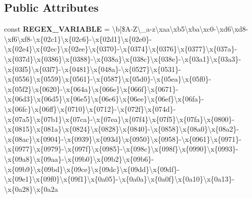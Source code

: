 \subsection*{Public Attributes}
\begin{DoxyCompactItemize}
\item 
const {\bfseries R\+E\+G\+E\+X\+\_\+\+V\+A\+R\+I\+A\+B\+LE} = \textquotesingle{}\textbackslash{}b\mbox{[}\$A-\/Z\textbackslash{}\+\_\+a-\/z\textbackslash{}xaa\textbackslash{}xb5\textbackslash{}xba\textbackslash{}xc0-\/\textbackslash{}xd6\textbackslash{}xd8-\/\textbackslash{}xf6\textbackslash{}xf8-\/\textbackslash{}x\{02c1\}\textbackslash{}x\{02c6\}-\/\textbackslash{}x\{02d1\}\textbackslash{}x\{02e0\}-\/\textbackslash{}x\{02e4\}\textbackslash{}x\{02ec\}\textbackslash{}x\{02ee\}\textbackslash{}x\{0370\}-\/\textbackslash{}x\{0374\}\textbackslash{}x\{0376\}\textbackslash{}x\{0377\}\textbackslash{}x\{037a\}-\/\textbackslash{}x\{037d\}\textbackslash{}x\{0386\}\textbackslash{}x\{0388\}-\/\textbackslash{}x\{038a\}\textbackslash{}x\{038c\}\textbackslash{}x\{038e\}-\/\textbackslash{}x\{03a1\}\textbackslash{}x\{03a3\}-\/\textbackslash{}x\{03f5\}\textbackslash{}x\{03f7\}-\/\textbackslash{}x\{0481\}\textbackslash{}x\{048a\}-\/\textbackslash{}x\{0527\}\textbackslash{}x\{0531\}-\/\textbackslash{}x\{0556\}\textbackslash{}x\{0559\}\textbackslash{}x\{0561\}-\/\textbackslash{}x\{0587\}\textbackslash{}x\{05d0\}-\/\textbackslash{}x\{05ea\}\textbackslash{}x\{05f0\}-\/\textbackslash{}x\{05f2\}\textbackslash{}x\{0620\}-\/\textbackslash{}x\{064a\}\textbackslash{}x\{066e\}\textbackslash{}x\{066f\}\textbackslash{}x\{0671\}-\/\textbackslash{}x\{06d3\}\textbackslash{}x\{06d5\}\textbackslash{}x\{06e5\}\textbackslash{}x\{06e6\}\textbackslash{}x\{06ee\}\textbackslash{}x\{06ef\}\textbackslash{}x\{06fa\}-\/\textbackslash{}x\{06fc\}\textbackslash{}x\{06ff\}\textbackslash{}x\{0710\}\textbackslash{}x\{0712\}-\/\textbackslash{}x\{072f\}\textbackslash{}x\{074d\}-\/\textbackslash{}x\{07a5\}\textbackslash{}x\{07b1\}\textbackslash{}x\{07ca\}-\/\textbackslash{}x\{07ea\}\textbackslash{}x\{07f4\}\textbackslash{}x\{07f5\}\textbackslash{}x\{07fa\}\textbackslash{}x\{0800\}-\/\textbackslash{}x\{0815\}\textbackslash{}x\{081a\}\textbackslash{}x\{0824\}\textbackslash{}x\{0828\}\textbackslash{}x\{0840\}-\/\textbackslash{}x\{0858\}\textbackslash{}x\{08a0\}\textbackslash{}x\{08a2\}-\/\textbackslash{}x\{08ac\}\textbackslash{}x\{0904\}-\/\textbackslash{}x\{0939\}\textbackslash{}x\{093d\}\textbackslash{}x\{0950\}\textbackslash{}x\{0958\}-\/\textbackslash{}x\{0961\}\textbackslash{}x\{0971\}-\/\textbackslash{}x\{0977\}\textbackslash{}x\{0979\}-\/\textbackslash{}x\{097f\}\textbackslash{}x\{0985\}-\/\textbackslash{}x\{098c\}\textbackslash{}x\{098f\}\textbackslash{}x\{0990\}\textbackslash{}x\{0993\}-\/\textbackslash{}x\{09a8\}\textbackslash{}x\{09aa\}-\/\textbackslash{}x\{09b0\}\textbackslash{}x\{09b2\}\textbackslash{}x\{09b6\}-\/\textbackslash{}x\{09b9\}\textbackslash{}x\{09bd\}\textbackslash{}x\{09ce\}\textbackslash{}x\{09dc\}\textbackslash{}x\{09dd\}\textbackslash{}x\{09df\}-\/\textbackslash{}x\{09e1\}\textbackslash{}x\{09f0\}\textbackslash{}x\{09f1\}\textbackslash{}x\{0a05\}-\/\textbackslash{}x\{0a0a\}\textbackslash{}x\{0a0f\}\textbackslash{}x\{0a10\}\textbackslash{}x\{0a13\}-\/\textbackslash{}x\{0a28\}\textbackslash{}x\{0a2a
\end{DoxyCompactItemize}
